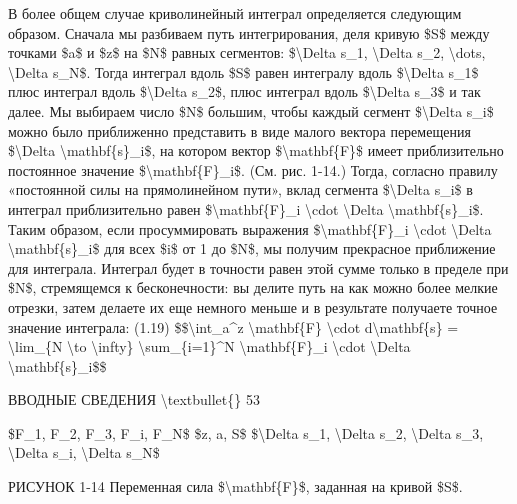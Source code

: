 \documentclass[10pt,oneside]{article}
\begin{document}
В более общем случае криволинейный интеграл определяется следующим образом. Сначала мы разбиваем путь интегрирования, деля кривую \$S\$ между точками \$a\$ и \$z\$ на \$N\$ равных сегментов: \$\textbackslash{}Delta s\_1, \textbackslash{}Delta s\_2, \textbackslash{}dots, \textbackslash{}Delta s\_N\$. Тогда интеграл вдоль \$S\$ равен интегралу вдоль \$\textbackslash{}Delta s\_1\$ плюс интеграл вдоль \$\textbackslash{}Delta s\_2\$, плюс интеграл вдоль \$\textbackslash{}Delta s\_3\$ и так далее. Мы выбираем число \$N\$ большим, чтобы каждый сегмент \$\textbackslash{}Delta s\_i\$ можно было приближенно представить в виде малого вектора перемещения \$\textbackslash{}Delta \textbackslash{}mathbf\{s\}\_i\$, на котором вектор \$\textbackslash{}mathbf\{F\}\$ имеет приблизительно постоянное значение \$\textbackslash{}mathbf\{F\}\_i\$. (См. рис. 1-14.) Тогда, согласно правилу «постоянной силы на прямолинейном пути», вклад сегмента \$\textbackslash{}Delta s\_i\$ в интеграл приблизительно равен \$\textbackslash{}mathbf\{F\}\_i \textbackslash{}cdot \textbackslash{}Delta \textbackslash{}mathbf\{s\}\_i\$. Таким образом, если просуммировать выражения \$\textbackslash{}mathbf\{F\}\_i \textbackslash{}cdot \textbackslash{}Delta \textbackslash{}mathbf\{s\}\_i\$ для всех \$i\$ от 1 до \$N\$, мы получим прекрасное приближение для интеграла. Интеграл будет в точности равен этой сумме только в пределе при \$N\$, стремящемся к бесконечности: вы делите путь на как можно более мелкие отрезки, затем делаете их еще немного меньше и в результате получаете точное значение интеграла: (1.19) \$\$\textbackslash{}int\_a\textasciicircum{}z \textbackslash{}mathbf\{F\} \textbackslash{}cdot d\textbackslash{}mathbf\{s\} = \textbackslash{}lim\_\{N \textbackslash{}to \textbackslash{}infty\} \textbackslash{}sum\_\{i=1\}\textasciicircum{}N \textbackslash{}mathbf\{F\}\_i \textbackslash{}cdot \textbackslash{}Delta \textbackslash{}mathbf\{s\}\_i\$\$\par

ВВОДНЫЕ СВЕДЕНИЯ \textbackslash{}textbullet\{\} 53\par

\$F\_1, F\_2, F\_3, F\_i, F\_N\$ \$z, a, S\$ \$\textbackslash{}Delta s\_1, \textbackslash{}Delta s\_2, \textbackslash{}Delta s\_3, \textbackslash{}Delta s\_i, \textbackslash{}Delta s\_N\$\par

РИСУНОК 1-14 Переменная сила \$\textbackslash{}mathbf\{F\}\$, заданная на кривой \$S\$.\par
\end{document}
